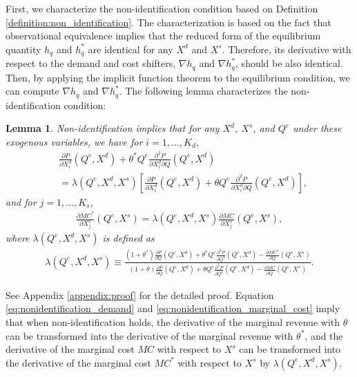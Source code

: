 \documentclass[11pt, a4paper]{article}
\newtheorem{lemma}{Lemma}
\theoremstyle{remark}
\begin{document}
First, we characterize the non-identification condition based on Definition \ref{definition:non_identification}.
The characterization is based on the fact that observational equivalence implies that the reduced form of the equilibrium quantity $h_q$ and $h_q^{*}$ are identical for any $X^{d}$ and $X^{s}$.
Therefore, its derivative with respect to the demand and cost shifters, $\nabla h_q$ and $\nabla h_q^{*}$, should be also identical.
Then, by applying the implicit function theorem to the equilibrium condition, we can compute $\nabla h_q$ and $\nabla h_q^{*}$.
The following lemma characterizes the non-identification condition:
\begin{lemma}\label{lemma:nonidentification_charaterization}
    Non-identification implies that for any $X^{d}$, $X^{s}$, and $Q^e$ under these exogenous variables, we have for $i = 1, \ldots, K_d$,
    \begin{align}
        &\frac{\partial P}{\partial X^{d}_{i}}(Q^e, X^{d}) + \theta^{*} Q^e \frac{\partial^2 P}{\partial X^{d}_{i}\partial Q}(Q^e, X^{d})\\  
        &= \lambda(Q^e, X^{d}, X^{s})\left[ \frac{\partial P}{\partial X^{d}_{i}}(Q^e, X^{d}) + \theta Q^e \frac{\partial^2 P}{\partial X^{d}_{i}\partial Q}(Q^e, X^{d}) \right], \label{eq:nonidentification_demand}
    \end{align}
    and for $j = 1,\ldots, K_s$,
    \begin{align}
        \frac{\partial MC^{*}}{\partial X^{s}_j}(Q^e, X^{s}) = \lambda(Q^e, X^{d}, X^{s}) \frac{\partial MC}{\partial X^{s}_j}(Q^e, X^{s}),\label{eq:nonidentification_marginal_cost}
    \end{align}
    where $\lambda(Q^e, X^{d}, X^{s})$ is defined as
    \begin{align}
        \lambda(Q^e, X^{d}, X^{s}) \equiv \frac{(1+\theta^{*})\frac{\partial P}{\partial Q}(Q^e, X^{d}) + \theta^{*} Q^e\frac{\partial^2 P}{\partial Q^2}(Q^e, X^{d}) - \frac{\partial MC^{*}}{\partial Q}(Q^e, X^{s})}{(1+\theta)\frac{\partial P}{\partial Q}(Q^e, X^{d}) + \theta Q^e\frac{\partial^2 P}{\partial Q^2}(Q^e, X^{d}) - \frac{\partial MC}{\partial Q}(Q^e, X^{s})}. \label{eq:lambda_foc}
    \end{align}
\end{lemma}
See Appendix \ref{appendix:proof} for the detailed proof.
Equation \eqref{eq:nonidentification_demand} and \eqref{eq:nonidentification_marginal_cost} imply that when non-identification holds, the derivative of the marginal revenue with $\theta$ can be transformed into the derivative of the marginal revenue with $\theta^{*}$, and the derivative of the marginal cost $MC$ with respect to $X^{s}$ can be transformed into the derivative of the marginal cost $MC^{*}$ with respect to $X^{s}$ by $\lambda(Q^e, X^{d}, X^{s})$.
\end{document}
